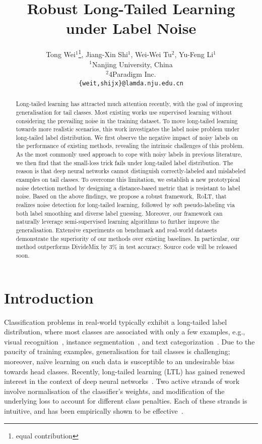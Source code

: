 \documentclass{article}
\title{Robust Long-Tailed Learning under Label Noise}
\author{
    Tong Wei$^1$\thanks{equal contribution}, \quad Jiang-Xin Shi$^1$\footnotemark[1], \quad Wei-Wei Tu$^2$, \quad Yu-Feng Li$^1$ \\
    $^1$Nanjing University, China \\
    $^2$4Paradigm Inc. \\
    \texttt{\{weit,shijx\}@lamda.nju.edu.cn}\\
}
\def\algo{{\textsc{RoLT}}}
\begin{document}
\maketitle

\begin{abstract}
Long-tailed learning has attracted much attention recently, with the goal of improving generalisation for tail classes. Most existing works use supervised learning without considering the prevailing noise in the training dataset. To move long-tailed learning towards more realistic scenarios, this work investigates the label noise problem under long-tailed label distribution. We first observe the negative impact of noisy labels on the performance of existing methods, revealing the intrinsic challenges of this problem. As the most commonly used approach to cope with noisy labels in previous literature, we then find that the small-loss trick fails under long-tailed label distribution. The reason is that deep neural networks cannot distinguish correctly-labeled and mislabeled examples on tail classes. To overcome this limitation, we establish a new prototypical noise detection method by designing a distance-based metric that is resistant to label noise. Based on the above findings, we propose a robust framework,~\algo, that realizes noise detection for long-tailed learning, followed by soft pseudo-labeling via both label smoothing and diverse label guessing. Moreover, our framework can naturally leverage semi-supervised learning algorithms to further improve the generalisation. Extensive experiments on benchmark and real-world datasets demonstrate the superiority of our methods over existing baselines. In particular,
our method outperforms DivideMix by 3\% in test accuracy. Source code will be released soon. \end{abstract}



\section{Introduction}

Classification problems in real-world typically exhibit a long-tailed label distribution, where most classes are associated with only a few examples, e.g., visual recognition~\cite{DBLP:conf/cvpr/HornASCSSAPB18,DBLP:conf/cvpr/0002MZWGY19,DBLP:conf/cvpr/TanWLLOYY20}, instance segmentation~\cite{DBLP:conf/cvpr/GuptaDG19}, and text categorization~\cite{weit2020tnnls}. Due to the paucity of training examples, generalisation for tail classes is challenging; moreover, naïve learning on such data is susceptible to an undesirable bias towards head classes. Recently, long-tailed learning (LTL) has gained renewed interest in the context of deep neural networks~\cite{DBLP:conf/nips/WangRH17,DBLP:conf/nips/CaoWGAM19ldam,DBLP:conf/cvpr/CuiJLSB19,DBLP:conf/iclr/KangXRYGFK20,DBLP:conf/eccv/WuH0WL20,DBLP:conf/nips/YangX20rethinking,DBLP:journals/corr/abs-2104-02703,wang2021diverse}. Two active strands of work involve normalisation of the classifier's weights, and modification of the underlying loss to account for different class penalties. Each of these strands is intuitive, and has been empirically shown to be effective~\cite{menon2021logitadjust}. 
\end{document}
